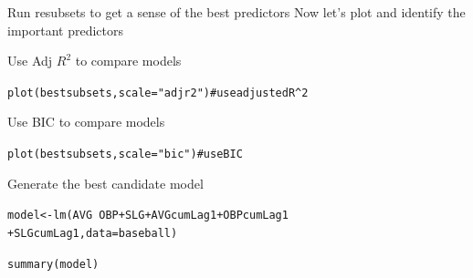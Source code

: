 \documentclass{beamer}\usepackage[]{graphicx}\usepackage[]{color}
\makeatletter
\newcommand{\hlstr}[1]{\textcolor[rgb]{1,0.894,0.71}{#1}}%
\newcommand{\hlcom}[1]{\textcolor[rgb]{0.824,0.706,0.549}{#1}}%
\newcommand{\hlopt}[1]{\textcolor[rgb]{1,0.894,0.769}{#1}}%
\newcommand{\hlstd}[1]{\textcolor[rgb]{1,0.894,0.769}{#1}}%
\newcommand{\hlkwb}[1]{\textcolor[rgb]{0.804,0.776,0.451}{#1}}%
\newcommand{\hlkwc}[1]{\textcolor[rgb]{0.78,0.941,0.545}{#1}}%
\newcommand{\hlkwd}[1]{\textcolor[rgb]{1,0.78,0.769}{#1}}%
\newenvironment{kframe}{%
 \def\at@end@of@kframe{}%
 \ifinner\ifhmode%
  \def\at@end@of@kframe{\end{minipage}}%
  \begin{minipage}{\columnwidth}%
 \fi\fi%
 \def\FrameCommand##1{\hskip\@totalleftmargin \hskip-\fboxsep
 \colorbox{shadecolor}{##1}\hskip-\fboxsep
     \hskip-\linewidth \hskip-\@totalleftmargin \hskip\columnwidth}%
 \MakeFramed {\advance\hsize-\width
   \@totalleftmargin\z@ \linewidth\hsize
   \@setminipage}}%
 {\par\unskip\endMakeFramed%
 \at@end@of@kframe}
\newenvironment{knitrout}{}{} %
\makeatother
\begin{document}
\begin{darkframes}
\begin{frame}[fragile]{Run resubsets to get a sense of the best predictors}
      {Now let's plot and identify the important predictors}
    \end{frame}


    \begin{frame}[fragile]{Use Adj $R^2$ to compare models}
      \fontsize{8}{8}\selectfont  
\begin{knitrout}
\begin{kframe}
\begin{alltt}
\hlkwd{plot}\hlstd{(bestsubsets,} \hlkwc{scale}\hlstd{=}\hlstr{"adjr2"}\hlstd{)}  \hlcom{# use adjusted R^2}
\end{alltt}
\end{kframe}


\end{knitrout}

    \end{frame}     


    \begin{frame}[fragile]{Use BIC to compare models}
      \fontsize{8}{8}\selectfont  
\begin{knitrout}
\begin{kframe}
\begin{alltt}
\hlkwd{plot}\hlstd{(bestsubsets,} \hlkwc{scale}\hlstd{=}\hlstr{"bic"}\hlstd{)}  \hlcom{# use BIC}
\end{alltt}
\end{kframe}


\end{knitrout}

    \lc %
    \end{frame}

    \begin{frame}[fragile]{Generate the best candidate model}
    \fontsize{6}{6}\selectfont 

\begin{knitrout}
\begin{kframe}
\begin{alltt}
\hlstd{model} \hlkwb{<-} \hlkwd{lm}\hlstd{(AVG} \hlopt{~} \hlstd{OBP} \hlopt{+} \hlstd{SLG} \hlopt{+} \hlstd{AVGcumLag1} \hlopt{+} \hlstd{OBPcumLag1}
\hlopt{+} \hlstd{SLGcumLag1,} \hlkwc{data}\hlstd{=baseball)}

\hlkwd{summary}\hlstd{(model)}
\end{alltt}
\begin{verbatim}


\end{verbatim}
\end{kframe}
\end{knitrout}
\end{frame}
\end{darkframes}
\end{document}
